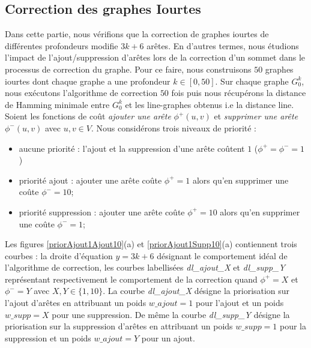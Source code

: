\documentclass[onecolumn, 12pt]{book}
\begin{document}
\subsection{Correction des graphes Iourtes}
Dans cette partie, nous v\'erifions que la correction de graphes iourtes de diff\'erentes profondeurs modifie $3k+6$ ar\^etes.
 En d'autres termes, nous \'etudions l'impact de l'ajout/suppression d'ar\^etes lors de la correction d'un sommet dans le processus de correction du graphe.
Pour ce faire, nous construisons $50$ graphes iourtes dont chaque graphe a une profondeur $k \in [0,50]$.
Sur chaque graphe $G_0^k$, nous ex\'ecutons  l'algorithme de correction  $50$ fois puis nous r\'ecup\'erons la distance de Hamming minimale entre $G_0^k$ et les line-graphes obtenus i.e la distance line.
\newline
Soient les fonctions de co\^ut  {\em ajouter une ar\^ete} $\phi^{+}(u,v)$ et {\em supprimer une ar\^ete} $\phi^{-}(u,v)$ avec $u,v \in V$.
Nous consid\'erons trois niveaux de priorit\'e :
\begin{itemize}
	\item aucune priorit\'e : l'ajout et la suppression d'une ar\^ete co\^utent $1$ ($\phi^{+} = \phi^{-} = 1$)
	\item priorit\'e ajout : ajouter une ar\^ete co\^ute $\phi^{+} = 1$ alors qu'en supprimer une co\^ute $\phi^{-} = 10$; 
	\item priorit\'e suppression : ajouter une ar\^ete co\^ute $\phi^{+} = 10$ alors qu'en supprimer une co\^ute $\phi^{-} = 1$; 
\end{itemize}
Les figures \ref{priorAjout1Ajout10}(a)  et \ref{priorAjout1Supp10}(a) contiennent trois courbes : la droite d'\'equation $y = 3k+6$ d\'esignant le comportement id\'eal de l'algorithme de correction, les courbes labellis\'ees {\em dl\_ajout\_X} et {\em dl\_supp\_Y}  repr\'esentant respectivement le comportement de la correction quand $\phi^{+} = X$ et $\phi^{-} = Y$ avec $X, Y \in \{1,10\}$. 
La courbe  {\em dl\_ajout\_X} d\'esigne la priorisation sur l'ajout d'ar\^etes en attribuant un poids $w\_ajout = 1$ pour l'ajout et un poids $w\_supp = X$ pour une suppression.
De m\^eme la  courbe  {\em dl\_supp\_Y} d\'esigne la priorisation sur la suppression d'ar\^etes en attribuant un poids $w\_supp = 1$ pour la suppression et un poids $w\_ajout = Y$ pour un ajout.
\end{document}
